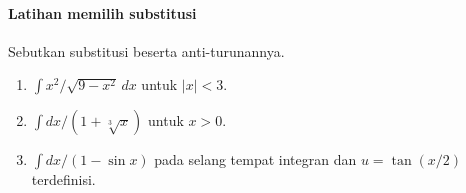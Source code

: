 \documentclass{../../kalkulus-ppt}
\begin{document}
\begin{frame}{\insertsection}
    \framesubtitle{Latihan memilih substitusi}
    \begin{latihan}
        Sebutkan substitusi beserta anti-turunannya.
        \begin{enumerate}
            \item $\int x^2/\sqrt{9-x^2}\,dx$ untuk $|x|<3$.
            \item $\int dx/(1+\sqrt[3]{x})$ untuk $x>0$.
            \item $\int dx/(1-\sin x)$ pada selang tempat integran dan
                $u=\tan(x/2)$ terdefinisi.
        \end{enumerate}
    \end{latihan}
\end{frame}
\end{document}
